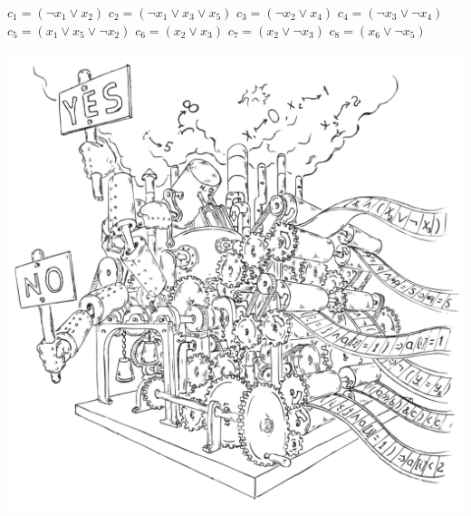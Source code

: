 \documentclass{beamer}
\begin{document}
\begin{frame}
$c_1 = (\lnot x_1 \vee x_2 )$\newline
$c_2 = (\lnot x_1 \vee x_3 \vee x_5 )$\newline
$c_3 = (\lnot x_2 \vee x_4 )$\newline
$c_4 = (\lnot x_3 \vee \lnot x_4 )$\newline
$c_5 = (x_1 \vee x_5 \vee \lnot x_2 )$\newline
$c_6 = (x_2 \vee x_3 )$\newline
$c_7 = (x_2 \vee \lnot x_3 )$\newline
$c_8 = (x_6 \vee \lnot x_5 )$\newline
\end{frame}

\begin{frame}
\includegraphics[scale=0.5]{../decision-procedure.png}
\end{frame}
\end{document}
